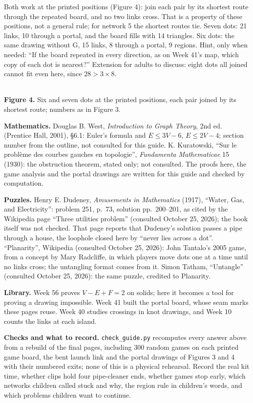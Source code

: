 Both work at the printed positions (Figure 4): join each pair by its shortest route through the repeated board, and no two links cross. That is a property of these positions, not a general rule; for network 5 the shortest routes tie. Seven dots: 21 links, 10 through a portal, and the board fills with 14 triangles. Six dots: the same drawing without G, 15 links, 8 through a portal, 9 regions. Hint, only when needed: ``If the board repeated in every direction, as on Week 41's map, which copy of each dot is nearest?'' Extension for adults to discuss: eight dots all joined cannot fit even here, since $28>3\times8$.\par\needspace{8cm}
\begin{center}
\qquad\qquad{}\\[4pt]
{\small\textbf{Figure 4.} Six and seven dots at the printed positions, each pair joined by its shortest route; numbers as in Figure 3.}
\end{center}

\textbf{Mathematics.} Douglas B. West, \emph{Introduction to Graph Theory}, 2nd ed. (Prentice Hall, 2001), \S6.1: Euler's formula and $E\le3V-6$, $E\le2V-4$; section number from the outline, not consulted for this guide. K. Kuratowski, ``Sur le probl\`eme des courbes gauches en topologie'', \emph{Fundamenta Mathematicae} 15 (1930): the obstruction theorem, stated only; not consulted. The proofs here, the game analysis and the portal drawings are written for this guide and checked by computation.

\textbf{Puzzles.} Henry E. Dudeney, \emph{Amusements in Mathematics} (1917), ``Water, Gas, and Electricity'': problem 251, p.~73, solution pp.~200--201, as cited by the Wikipedia page ``Three utilities problem'' (consulted October 25, 2026); the book itself was not checked. That page reports that Dudeney's solution passes a pipe through a house, the loophole closed here by ``never lies across a dot''. ``Planarity'', Wikipedia (consulted October 25, 2026): John Tantalo's 2005 game, from a concept by Mary Radcliffe, in which players move dots one at a time until no links cross; the untangling format comes from it. Simon Tatham, ``Untangle'' (consulted October 25, 2026): the same puzzle, credited to Planarity.

\textbf{Library.} Week 56 proves $V-E+F=2$ on solids; here it becomes a tool for proving a drawing impossible. Week 41 built the portal board, whose seam marks these pages reuse. Week 40 studies crossings in knot drawings, and Week 10 counts the links at each island.

\textbf{Checks and what to record.} \texttt{check\_guide.py} recomputes every answer above from a rebuild of the final pages, including 300 random games on each printed game board, the bent launch link and the portal drawings of Figures 3 and 4 with their numbered exits; none of this is a physical rehearsal. Record the real kit time, whether clips hold four pipe-cleaner ends, whether games stop early, which networks children called stuck and why, the region rule in children's words, and which problems children want to continue.
